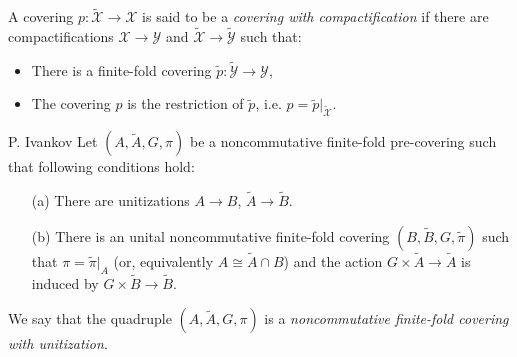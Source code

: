 \documentclass{beamer}
\theoremstyle{plain}
\begin{document}
\begin{frame}


\begin{definition}\label{top_cov_comp_defn}
	A   covering $p: \widetilde{   \mathcal X } \to \mathcal X$ is said to be a \textit{ covering with compactification} if there are compactifications ${   \mathcal X } \to {   \mathcal Y }$ and $\widetilde{   \mathcal X } \to \widetilde{   \mathcal Y }$ such that:
	\begin{itemize}
		\item There is a finite-fold  covering $\widetilde{p}:\widetilde{   \mathcal Y }\to {   \mathcal Y }$,
		\item The covering $p$ is the restriction of $\widetilde{p}$, i.e. $p = \widetilde{p}|_{\widetilde{   \mathcal X }}$.
	\end{itemize}
\end{definition}
\begin{definition}\label{fin_comp_defn}\alert{P. Ivankov}
	Let $\left(A, \widetilde{A}, G, \pi \right)$ be a noncommutative finite-fold  pre-covering such  that following conditions hold:
	\begin{enumerate}
		\item[(a)] 
		There are unitizations $A \to B$, $\widetilde{A} \to \widetilde{B}$.
		\item[(b)] There is an %
		unital  noncommutative finite-fold covering	$\left(B ,\widetilde{B}, G, \widetilde{\pi} \right)$ such that $\pi = \widetilde{\pi}|_A$ (or, equivalently $A \cong \widetilde{A}\cap B$) and the action $G \times\widetilde{A} \to \widetilde{A}$ is induced by $G \times\widetilde{B} \to \widetilde{B}$.
	\end{enumerate}
	We say that the  quadruple $\left(A, \widetilde{A}, G, \pi \right)$ is a
	\textit{noncommutative finite-fold covering with unitization}. 
\end{definition}

\end{frame}
\end{document}
